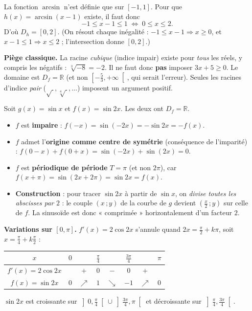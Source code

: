 \documentclass[11pt,a4paper]{article}
\newcommand{\R}{\mathbb{R}}
\newcommand{\Df}{D_f}
\newcommand{\croit}{\textcolor{varcol}{\Large$\nearrow$}}
\newcommand{\decroit}{\textcolor{varcol}{\Large$\searrow$}}
\begin{document}
\begin{exemple}[Domaine d'un arcsinus composé : $h(x)=\arcsin(x-1)$]
La fonction $\arcsin$ n'est définie que sur $[-1,1]$. Pour que $h(x)=\arcsin(x-1)$
existe, il faut donc
\[
  -1\leq x-1\leq 1 \;\Longleftrightarrow\; 0\leq x\leq 2 .
\]
D'où $\boxed{D_h=[0,2]}$. (On résout chaque inégalité : $-1\leq x-1\Rightarrow x\geq 0$,
et $x-1\leq 1\Rightarrow x\leq 2$ ; l'intersection donne $[0,2]$.)
\end{exemple}

\begin{exemple}[{Domaine d'une racine cubique : $f(x)=\sqrt[3]{3x+5}$}]
\textbf{Piège classique.} La racine \emph{cubique} (indice impair) existe pour
\emph{tous} les réels, y compris les négatifs : $\sqrt[3]{-8}=-2$. Il ne faut donc
\textbf{pas} imposer $3x+5\geq 0$. Le domaine est $\boxed{\Df=\R}$ (et non
$\left[-\tfrac53,+\infty\right[$, qui serait l'erreur). Seules les racines d'indice
\emph{pair} ($\sqrt{\ },\sqrt[4]{\ },\dots$) imposent un argument positif.
\end{exemple}

\begin{exemple}
Soit $g(x)=\sin x$ et $f(x)=\sin 2x$. Les deux ont $\Df=\R$.
\begin{itemize}[leftmargin=1.5em,topsep=2pt]
  \item $f$ est \textbf{impaire} : $f(-x)=\sin(-2x)=-\sin 2x=-f(x)$.
  \item $f$ admet l'\textbf{origine comme centre de symétrie} (conséquence de l'imparité) :
        $f(0-x)+f(0+x)=\sin(-2x)+\sin(2x)=0$.
  \item $f$ est \textbf{périodique de période} $T=\pi$ (et non $2\pi$), car
        $f(x+\pi)=\sin(2x+2\pi)=\sin 2x=f(x)$.
  \item \textbf{Construction} : pour tracer $\sin 2x$ à partir de $\sin x$, on
        \emph{divise toutes les abscisses par $2$} : le couple $(x\,;y)$ de la courbe de
        $g$ devient $\left(\frac{x}{2}\,;y\right)$ sur celle de $f$. La sinusoïde est donc
        « comprimée » horizontalement d'un facteur $2$.
\end{itemize}
\textbf{Variations sur $[0,\pi]$.} $f'(x)=2\cos 2x$ s'annule quand $2x=\frac{\pi}{2}+k\pi$,
soit $x=\frac{\pi}{4}+k\frac{\pi}{2}$ :
\begin{center}
\renewcommand{\arraystretch}{1.6}\setlength{\tabcolsep}{11pt}
\begin{tabular}{|c|ccccccc|}
\hline
\rowcolor{primarylight}
$x$ & $0$ & & $\tfrac{\pi}{4}$ & & $\tfrac{3\pi}{4}$ & & $\pi$ \\
\hline
$f'(x)=2\cos 2x$ & & $+$ & $0$ & $-$ & $0$ & $+$ & \\
\hline
$f(x)=\sin 2x$ & $0$ & \croit & $1$ & \decroit & $-1$ & \croit & $0$ \\
\hline
\end{tabular}
\end{center}
$\sin 2x$ est croissante sur $\left]0,\tfrac{\pi}{4}\right[\cup\left]\tfrac{3\pi}{4},\pi\right[$
et décroissante sur $\left]\tfrac{\pi}{4},\tfrac{3\pi}{4}\right[$.
\end{exemple}
\end{document}
